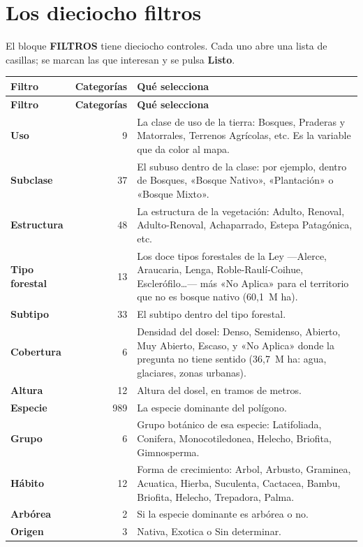\documentclass[11pt,a4paper]{report}
\newcommand{\campo}[1]{\textcolor{conaf}{\textbf{#1}}}
\begin{document}
\section{Los dieciocho filtros}

El bloque \campo{FILTROS} tiene dieciocho controles. Cada uno abre una lista de
casillas; se marcan las que interesan y se pulsa \campo{Listo}.

\begin{longtable}{@{}L{3.2cm}r L{8.6cm}@{}}
\toprule
\textbf{Filtro} & \textbf{Categorías} & \textbf{Qué selecciona}\\
\midrule
\endfirsthead
\toprule
\textbf{Filtro} & \textbf{Categorías} & \textbf{Qué selecciona}\\
\midrule
\endhead
\campo{Uso} & 9 & La clase de uso de la tierra: Bosques, Praderas y Matorrales, Terrenos Agrícolas, etc. Es la variable que da color al mapa.\\
\campo{Subclase} & 37 & El subuso dentro de la clase: por ejemplo, dentro de Bosques, «Bosque Nativo», «Plantación» o «Bosque Mixto».\\
\campo{Estructura} & 48 & La estructura de la vegetación: Adulto, Renoval, Adulto-Renoval, Achaparrado, Estepa Patagónica, etc.\\
\campo{Tipo forestal} & 13 & Los doce tipos forestales de la Ley —Alerce, Araucaria, Lenga, Roble-Raulí-Coihue, Esclerófilo…— más «No Aplica» para el territorio que no es bosque nativo (60,1~M ha).\\
\campo{Subtipo} & 33 & El subtipo dentro del tipo forestal.\\
\campo{Cobertura} & 6 & Densidad del dosel: Denso, Semidenso, Abierto, Muy Abierto, Escaso, y «No Aplica» donde la pregunta no tiene sentido (36,7~M ha: agua, glaciares, zonas urbanas).\\
\campo{Altura} & 12 & Altura del dosel, en tramos de metros.\\
\campo{Especie} & 989 & La especie dominante del polígono.\\
\campo{Grupo} & 6 & Grupo botánico de esa especie: Latifoliada, Conifera, Monocotiledonea, Helecho, Briofita, Gimnosperma.\\
\campo{Hábito} & 12 & Forma de crecimiento: Arbol, Arbusto, Graminea, Acuatica, Hierba, Suculenta, Cactacea, Bambu, Briofita, Helecho, Trepadora, Palma.\\
\campo{Arbórea} & 2 & Si la especie dominante es arbórea o no.\\
\campo{Origen} & 3 & Nativa, Exotica o Sin determinar.\\

\end{longtable}
\end{document}
